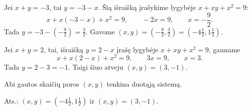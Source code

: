 \documentclass[11pt,a4paper]{article}
\begin{document}
Jei $x+y = -3$, tai $y = -3-x$. Šią išraišką įrašykime lygybėje $x+xy+x^2 = 9$:
\begin{equation*}
x+x(-3-x) + x^2 = 9,\qquad
-2x=9,\qquad
x=-\frac{9}{2}.
\end{equation*} 
Tada $y = -3-\left(-\frac{9}{2}\right) = \frac{3}{2}$. Gavome $(x, y)=\left(-\frac{9}{2}, \frac{3}{2}\right)=\left(-4\frac{1}{2}, 1\frac{1}{2}\right)$.

Jei $x+y = 2$, tai, išraišką $y = 2-x$ įrašę lygybėje $x+xy+x^2 = 9$, gauname
\begin{equation*}
x+x(2-x) + x^2 = 9,\qquad
3x=9,\qquad
x=3.
\end{equation*}
Tada $y = 2-3=-1$. Taigi šiuo atveju $(x, y)=(3,-1)$.

Abi gautos skaičių poros $(x, y)$ tenkina duotąją sistemą.
\begin{flushright}
     Ats.: $(x, y)=\left(-4\frac{1}{2}, 1\frac{1}{2}\right)$ ir $(x, y)=(3,-1)$.  
    \end{flushright}

\vspace{0,7cm}
\end{document}
